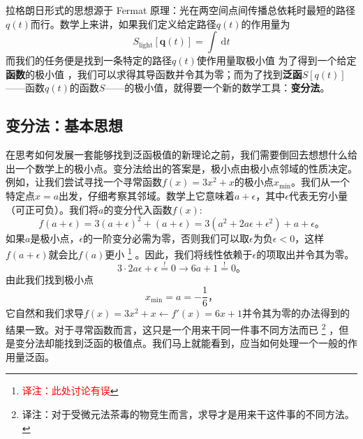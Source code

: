 拉格朗日形式的思想源于 Fermat 原理：光在两空间点间传播总依耗时最短的路径\(q(t)\)而行。数学上来讲，如果我们定义给定路径\(q(t)\)的作用量为
\[
S_{\text{light}}[{\mathbf q}(t)] = \int ~{\mathrm d}t
\]
而我们的任务便是找到一条特定的路径\(q(t)\)使作用量取极小值%
%
为了得到一个给定{\bf 函数}的极小值%
%
，我们可以求得其导函数并令其为零；而为了找到{\bf 泛函}\(S[q(t)]\)——函数\(q(t)\)的函数\(S\)——的极小值，就得要一个新的数学工具：{\bf 变分法}。


\subsection{变分法：基本思想}\label{sec4.1.2}

在思考如何发展一套能够找到泛函极值的新理论之前，我们需要倒回去想想什么给出一个数学上的极小点。变分法给出的答案是，极小点由极小点邻域的性质决定。例如，让我们尝试寻找一个寻常函数\(f(x)=3x^2+x\)的极小点\(x_{\min}\)。我们从一个特定点\(x=a\)出发，仔细考察其邻域。数学上它意味着\(a + \epsilon\)，其中\(\epsilon\)代表无穷小量（可正可负）。我们将\(a\)的变分代入函数\(f(x)\):
\[
f(a+\epsilon) = 3(a+\epsilon)^2+(a+\epsilon) = 3(a^2+2a\epsilon+\epsilon^2)+a+\epsilon \text{。}
\]
如果\(a\)是极小点，\(\epsilon\)的一阶变分必需为零，否则我们可以取\(\epsilon\)为负\(\epsilon < 0\)，这样\(f(a+\epsilon)\)就会比\(f(a)\)更小%
\footnote{\textcolor{red}{译注：此处讨论有误}}%
。因此，我们将线性依赖于\(\epsilon\)的项取出并令其为零。
\[
3 \cdot 2a\epsilon + \epsilon \overset{\text{!}}{=} 0 \rightarrow 6a+1\overset{\text{!}}{=}0\text{。}
\]
由此我们找到极小点
\[
x_{\min} = a = -\frac{1}{6} \text{，}
\]
它自然和我们求导\(f(x)=3x^2+x\leftarrow f'(x)=6x+1\)并令其为零的办法得到的结果一致。对于寻常函数而言，这只是一个用来干同一件事不同方法而已%
\footnote{译注：对于受微元法茶毒的物竞生而言，求导才是用来干这件事的不同方法。}%
，但是变分法却能找到泛函的极值点。我们马上就能看到，应当如何处理一个一般的作用量泛函。

